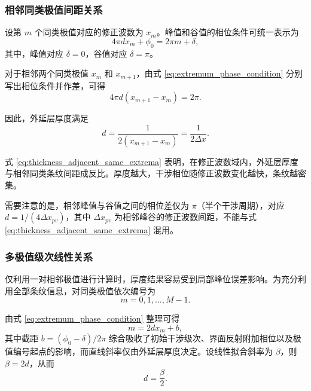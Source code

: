 \documentclass[withoutpreface,bwprint]{cumcmthesis}
\begin{document}
\subsubsection{相邻同类极值间距关系}

设第 $m$ 个同类极值对应的修正波数为 $x_m$。峰值和谷值的相位条件可统一表示为
\begin{equation}
	4\pi d x_m+\phi_0
	=
	2\pi m+\delta,
	\label{eq:extremum_phase_condition}
\end{equation}
其中，峰值对应 $\delta=0$，谷值对应 $\delta=\pi$。

对于相邻两个同类极值 $x_m$ 和 $x_{m+1}$，由式 \eqref{eq:extremum_phase_condition} 分别写出相位条件并作差，可得
\begin{equation}
	4\pi d
	\left(
	x_{m+1}-x_m
	\right)
	=
	2\pi.
	\label{eq:adjacent_same_extrema_phase_difference}
\end{equation}

因此，外延层厚度满足
\begin{equation}
	d
	=
	\frac{1}{
		2\left(
		x_{m+1}-x_m
		\right)
	}
	=
	\frac{1}{2\Delta x}.
	\label{eq:thickness_adjacent_same_extrema}
\end{equation}

式 \eqref{eq:thickness_adjacent_same_extrema} 表明，在修正波数域内，外延层厚度与相邻同类条纹间距成反比。厚度越大，干涉相位随修正波数变化越快，条纹越密集。

需要注意的是，相邻峰值与谷值之间的相位差仅为 $\pi$（半个干涉周期），对应 $d=1/(4\Delta x_{pv})$，其中 $\Delta x_{pv}$ 为相邻峰谷的修正波数间距，不能与式 \eqref{eq:thickness_adjacent_same_extrema} 混用。


\subsubsection{多极值级次线性关系}

仅利用一对相邻极值进行计算时，厚度结果容易受到局部峰位误差影响。为充分利用全部条纹信息，对同类极值依次编号为
\[
m=0,1,\ldots,M-1.
\]

由式 \eqref{eq:extremum_phase_condition} 整理可得
\begin{equation}
	m
	=
	2d x_m+b,
	\label{eq:extremum_order_linear_relation}
\end{equation}
其中截距 $b=(\phi_0-\delta)/2\pi$ 综合吸收了初始干涉级次、界面反射附加相位以及极值编号起点的影响，而直线斜率仅由外延层厚度决定。设线性拟合斜率为 $\beta$，则 $\beta=2d$，从而
\begin{equation}
	d=\frac{\beta}{2}.
	\label{eq:thickness_from_order_slope}
\end{equation}
\end{document}
